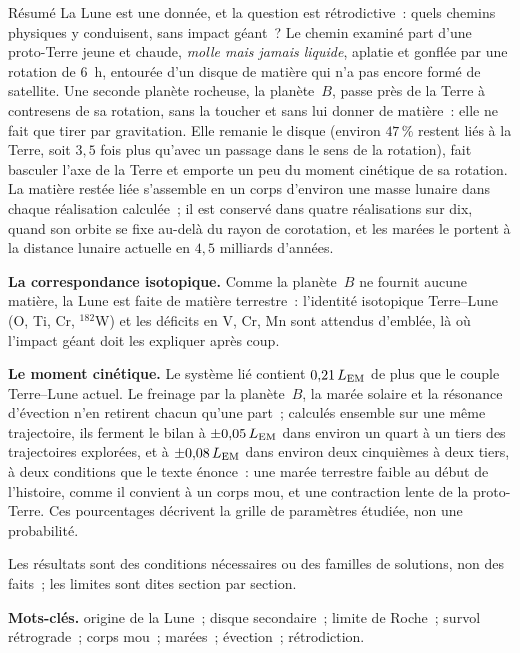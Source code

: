 \documentclass[11pt,a4paper]{article}
\newcommand{\LEM}{\ensuremath{L_{\rm EM}}}
\begin{document}
\begin{encadre}{Résumé}
\small
La Lune est une donnée, et la question est rétrodictive~: quels chemins physiques y conduisent, sans impact géant~? Le chemin examiné part d'une proto-Terre jeune et chaude, \emph{molle mais jamais liquide}, aplatie et gonflée par une rotation de $6$~h, entourée d'un disque de matière qui n'a pas encore formé de satellite. Une seconde planète rocheuse, la planète~$B$, passe près de la Terre à contresens de sa rotation, sans la toucher et sans lui donner de matière~: elle ne fait que tirer par gravitation. Elle remanie le disque (environ $47\,\%$ restent liés à la Terre, soit $3{,}5$ fois plus qu'avec un passage dans le sens de la rotation), fait basculer l'axe de la Terre et emporte un peu du moment cinétique de sa rotation. La matière restée liée s'assemble en un corps d'environ une masse lunaire dans chaque réalisation calculée~; il est conservé dans quatre réalisations sur dix, quand son orbite se fixe au-delà du rayon de corotation, et les marées le portent à la distance lunaire actuelle en $4{,}5$ milliards d'années.

\smallskip
\textbf{La correspondance isotopique.} Comme la planète~$B$ ne fournit aucune matière, la Lune est faite de matière terrestre~: l'identité isotopique Terre--Lune (O, Ti, Cr, $^{182}$W) et les déficits en V, Cr, Mn sont attendus d'emblée, là où l'impact géant doit les expliquer après coup.

\smallskip
\textbf{Le moment cinétique.} Le système lié contient $0{,}21\,\LEM$ de plus que le couple Terre--Lune actuel. Le freinage par la planète~$B$, la marée solaire et la résonance d'évection n'en retirent chacun qu'une part~; calculés ensemble sur une même trajectoire, ils ferment le bilan à $\pm0{,}05\,\LEM$ dans environ un quart à un tiers des trajectoires explorées, et à $\pm0{,}08\,\LEM$ dans environ deux cinquièmes à deux tiers, à deux conditions que le texte énonce~: une marée terrestre faible au début de l'histoire, comme il convient à un corps mou, et une contraction lente de la proto-Terre. Ces pourcentages décrivent la grille de paramètres étudiée, non une probabilité.

\smallskip
Les résultats sont des conditions nécessaires ou des familles de solutions, non des faits~; les limites sont dites section par section.

\smallskip
\textbf{Mots-clés.} origine de la Lune~; disque secondaire~; limite de Roche~; survol rétrograde~; corps mou~; marées~; évection~; rétrodiction.
\end{encadre}
\end{document}
